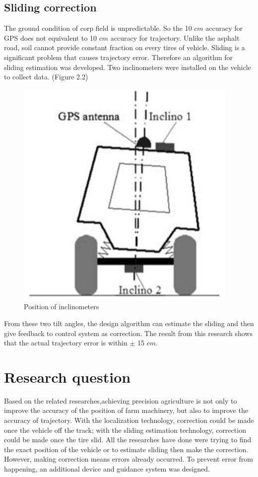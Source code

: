 \documentclass[letterpaper,12pt,oneside]{book}
\begin{document}
		\subsection{Sliding correction}
		The ground condition of corp field is unpredictable. So the 10 $cm$ accuracy for GPS does not equivalent to 10 $cm$ accuracy for trajectory. Unlike the asphalt road, soil cannot provide constant fraction on every tires of vehicle. Sliding is a significant problem that causes trajectory error. Therefore an algorithm for sliding estimation was developed. Two inclinometers were installed on the vehicle to collect data. (Figure 2.2) 
		\begin{figure}[ht!]
			\begin{center}
				\includegraphics[scale = 0.5]{slidingcorrection.png}
				\caption{Position of inclinometers}
			\end{center}
		\end{figure}
		From these two tilt angles, the design algorithm can estimate the sliding and then give feedback to control system as correction. The result from this research shows that the actual trajectory error is within $\pm$ 15 $cm$. \cite{lenain2006high}
		
		\section{Research question}
		Based on the related researches,achieving precision agriculture is not only to improve the accuracy of the position of farm machinery, but also to improve the accuracy of trajectory. With the localization technology, correction could be made once the vehicle off the track; with the sliding estimation technology, correction could be made once the tire slid. All the researches have done were trying to find the exact position of the vehicle or to estimate sliding then make the correction. However, making correction means errors already occurred. To prevent error from happening, an additional device and guidance system was designed.  
		
\end{document}
